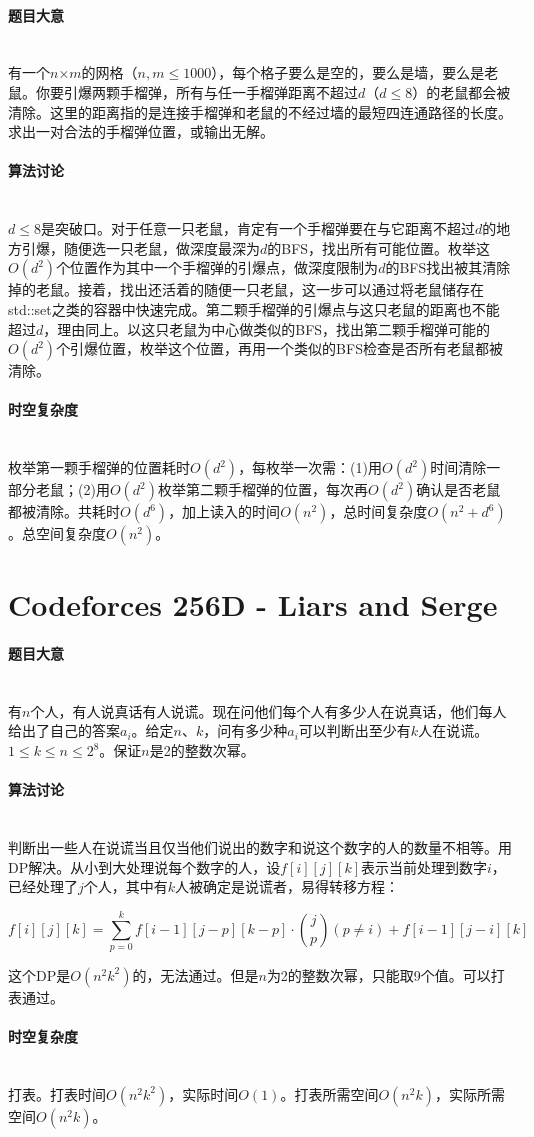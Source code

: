 \documentclass[UTF8]{ctexart}
\newcommand{\myparagraph}[1]{\paragraph{#1}\mbox{}\\}
\theoremstyle{nonumberplain}
\begin{document}
		\myparagraph{题目大意}
		
			有一个$n$×$m$的网格（$n,m \leq 1000$），每个格子要么是空的，要么是墙，要么是老鼠。你要引爆两颗手榴弹，所有与任一手榴弹距离不超过$d$（$d \leq 8$）的老鼠都会被清除。这里的距离指的是连接手榴弹和老鼠的不经过墙的最短四连通路径的长度。求出一对合法的手榴弹位置，或输出无解。
		
		\myparagraph{算法讨论}
		
			$d \leq 8$是突破口。对于任意一只老鼠，肯定有一个手榴弹要在与它距离不超过$d$的地方引爆，随便选一只老鼠，做深度最深为$d$的BFS，找出所有可能位置。枚举这$O(d^2)$个位置作为其中一个手榴弹的引爆点，做深度限制为$d$的BFS找出被其清除掉的老鼠。接着，找出还活着的随便一只老鼠，这一步可以通过将老鼠储存在std::set之类的容器中快速完成。第二颗手榴弹的引爆点与这只老鼠的距离也不能超过$d$，理由同上。以这只老鼠为中心做类似的BFS，找出第二颗手榴弹可能的$O(d^2)$个引爆位置，枚举这个位置，再用一个类似的BFS检查是否所有老鼠都被清除。
		
		\myparagraph{时空复杂度}
		
			枚举第一颗手榴弹的位置耗时$O(d^2)$，每枚举一次需：(1)用$O(d^2)$时间清除一部分老鼠；(2)用$O(d^2)$枚举第二颗手榴弹的位置，每次再$O(d^2)$确认是否老鼠都被清除。共耗时$O(d^6)$，加上读入的时间$O(n^2)$，总时间复杂度$O(n^2+d^6)$。总空间复杂度$O(n^2)$。
	
	\section{Codeforces 256D - Liars and Serge}
	
		\myparagraph{题目大意}
		
			有$n$个人，有人说真话有人说谎。现在问他们每个人有多少人在说真话，他们每人给出了自己的答案$a_i$。给定$n$、$k$，问有多少种${a_i}$可以判断出至少有$k$人在说谎。$1 \leq k \leq n \leq 2^8$。保证$n$是2的整数次幂。
		
		\myparagraph{算法讨论}
		
			判断出一些人在说谎当且仅当他们说出的数字和说这个数字的人的数量不相等。用DP解决。从小到大处理说每个数字的人，设$f[i][j][k]$表示当前处理到数字$i$，已经处理了$j$个人，其中有$k$人被确定是说谎者，易得转移方程：
			
			$$f[i][j][k]=\sum_{p=0}^k f[i-1][j-p][k-p] \cdot \binom{j}{p} (p\not=i) + f[i-1][j-i][k]$$
			
			这个DP是$O(n^2k^2)$的，无法通过。但是$n$为2的整数次幂，只能取9个值。可以打表通过。
		
		\myparagraph{时空复杂度}
		
			打表。打表时间$O(n^2k^2)$，实际时间$O(1)$。打表所需空间$O(n^2k)$，实际所需空间$O(n^2k)$。
	
\end{document}
